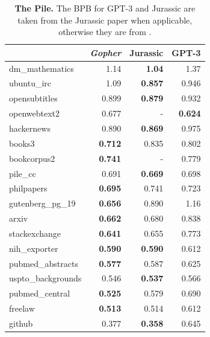 \documentclass[11pt, a4paper, logo, internal, copyright, nonumbering]{deepmind}
\newcommand{\gopher}{\textit{Gopher}\xspace}
\begin{document}
\begin{table}[t]
\begin{center}
\begin{tabular}{lrrr}
\toprule
{} &    \gopher &  Jurassic &     GPT-3 \\
\midrule
dm\_mathematics    &  1.14 &  \textbf{1.04} &  1.37 \\
ubuntu\_irc        &  1.09 &  \textbf{0.857} &  0.946 \\
opensubtitles     &  0.899 &  \textbf{0.879} &  0.932 \\
openwebtext2     &  0.677 &  - &  \textbf{0.624} \\
hackernews        &  0.890 &  \textbf{0.869} &  0.975 \\
books3            &  \textbf{0.712} &  0.835 &  0.802 \\
bookcorpus2            &  \textbf{0.741} &  -  &  0.779 \\
pile\_cc           &  0.691 & \textbf{0.669} &  0.698 \\
philpapers        &  \textbf{0.695} &  0.741 &  0.723 \\
gutenberg\_pg\_19   &  \textbf{0.656} &  0.890 &  1.16 \\
arxiv             &  \textbf{0.662} &  0.680 &  0.838 \\
stackexchange     &  \textbf{0.641} &  0.655 &  0.773 \\
nih\_exporter      &  \textbf{0.590} &  \textbf{0.590} &  0.612 \\
pubmed\_abstracts  &  \textbf{0.577} &  0.587 &  0.625 \\
uspto\_backgrounds &  0.546 &  \textbf{0.537} &  0.566 \\
pubmed\_central    &  \textbf{0.525} &  0.579 &  0.690 \\
freelaw           &  \textbf{0.513} &  0.514 &  0.612 \\
github            &  0.377 &  \textbf{0.358} &  0.645 \\
\bottomrule
\end{tabular}
\end{center}
\caption{\textbf{The Pile.}
The BPB for GPT-3 and Jurassic are taken from the Jurassic paper \citep{jurassic} when applicable, otherwise they are from \citep{pile}.
} 
\label{tab:pile}
\end{table}
\end{document}
